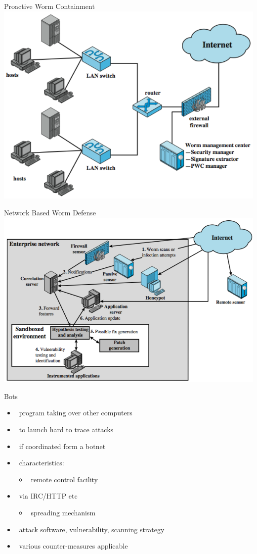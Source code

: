 \documentclass{beamer}
\begin{document}
\begin{frame}{Proactive Worm Containment}
\includegraphics[width=0.8\linewidth]{wormContaiment}
\end{frame}

\begin{frame}{Network Based Worm Defense}
\includegraphics[width=0.8\linewidth]{networkBasedAntiWorm}
\end{frame}


\begin{frame}{Bots}
  \begin{itemize}
  \item  program taking over other computers 
  \item  to launch hard to trace attacks 
  \item  if coordinated form a botnet 
  \item  characteristics: 
    \begin{itemize}
    \item  remote control facility 
    \end{itemize}
  \item  via IRC/HTTP etc 
    \begin{itemize}
    \item  spreading mechanism 
    \end{itemize}
  \item  attack software, vulnerability, scanning strategy 
  \item  various counter-measures applicable 
  \end{itemize}
\end{frame}
\end{document}
